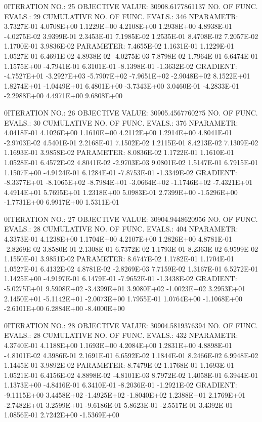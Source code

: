 \documentclass[
  letterpaper,
  toc=chapterentrywithdots,
  listof=totoc,
  11pt,
  headings=small,
  usegeometry]{scrreprt}
\begin{document}
\begin{nonmemlisting}
0ITERATION NO.:   25    OBJECTIVE VALUE:   30908.6177861137        NO. OF FUNC. EVALS.:  29
 CUMULATIVE NO. OF FUNC. EVALS.:      346
 NPARAMETR:  3.7327E-01  4.0708E+00  1.1229E+00  4.2108E+00  1.2938E+00  4.8938E-01 -4.0275E-02  3.9399E-01  2.3453E-01  7.1985E-02
             1.2535E-01  8.4708E-02  7.2057E-02  1.1700E-01  3.9836E-02
 PARAMETER:  7.4655E-02  1.1631E-01  1.1229E-01  1.0527E-01  6.4691E-02  4.8938E-02 -4.0275E-03  7.8798E-02  1.7964E-01  6.6474E-01
             1.1575E+00 -4.7941E-01  6.3101E-01 -8.1398E-01 -1.3632E-02
 GRADIENT:  -4.7527E+01 -3.2927E+03 -5.7907E+02 -7.9651E+02 -2.9048E+02  8.1522E+01  1.8274E+01 -1.0449E+01  6.4801E+00 -3.7343E+00
             3.0460E-01 -4.2833E-01 -2.2988E+00  4.4971E+00  9.6808E+00

0ITERATION NO.:   26    OBJECTIVE VALUE:   30905.4567760275        NO. OF FUNC. EVALS.:  30
 CUMULATIVE NO. OF FUNC. EVALS.:      376
 NPARAMETR:  4.0418E-01  4.1026E+00  1.1610E+00  4.2112E+00  1.2914E+00  4.8041E-01 -2.9703E-02  4.5401E-01  2.2168E-01  7.1502E-02
             1.2115E-01  8.4213E-02  7.1309E-02  1.1693E-01  3.9858E-02
 PARAMETER:  8.0836E-02  1.1722E-01  1.1610E-01  1.0528E-01  6.4572E-02  4.8041E-02 -2.9703E-03  9.0801E-02  1.5147E-01  6.7915E-01
             1.1507E+00 -4.9124E-01  6.1284E-01 -7.8753E-01 -1.3349E-02
 GRADIENT:  -8.3377E+01 -8.1065E+02 -8.7984E+01 -3.0664E+02 -1.1746E+02 -7.4321E+01  4.4914E+01  5.7695E+01  1.2318E+00  5.0983E-01
             2.7399E+00 -1.5296E+00 -1.7731E+00  6.9917E+00  1.5311E-01

0ITERATION NO.:   27    OBJECTIVE VALUE:   30904.9448620956        NO. OF FUNC. EVALS.:  28
 CUMULATIVE NO. OF FUNC. EVALS.:      404
 NPARAMETR:  4.3373E-01  4.1238E+00  1.1704E+00  4.2107E+00  1.2826E+00  4.8781E-01 -2.8269E-02  3.8580E-01  2.1308E-01  6.7372E-02
             1.1793E-01  8.2363E-02  6.9599E-02  1.1550E-01  3.9851E-02
 PARAMETER:  8.6747E-02  1.1782E-01  1.1704E-01  1.0527E-01  6.4132E-02  4.8781E-02 -2.8269E-03  7.7159E-02  1.3167E-01  6.5272E-01
             1.1425E+00 -4.9197E-01  6.1479E-01 -7.9652E-01 -1.3438E-02
 GRADIENT:  -5.0275E+01  9.5908E+02 -3.4399E+01  3.9080E+02 -1.0023E+02  3.2953E+01  2.1450E+01 -5.1142E+01 -2.0073E+00  1.7955E-01
             1.0764E+00 -1.1068E+00 -2.6101E+00  6.2884E+00 -8.4000E+00

0ITERATION NO.:   28    OBJECTIVE VALUE:   30904.5819376394        NO. OF FUNC. EVALS.:  28
 CUMULATIVE NO. OF FUNC. EVALS.:      432
 NPARAMETR:  4.3740E-01  4.1188E+00  1.1693E+00  4.2084E+00  1.2831E+00  4.8898E-01 -4.8101E-02  4.3986E-01  2.1691E-01  6.6592E-02
             1.1844E-01  8.2466E-02  6.9948E-02  1.1445E-01  3.9892E-02
 PARAMETER:  8.7479E-02  1.1768E-01  1.1693E-01  1.0521E-01  6.4156E-02  4.8898E-02 -4.8101E-03  8.7972E-02  1.4058E-01  6.3944E-01
             1.1373E+00 -4.8416E-01  6.3410E-01 -8.2036E-01 -1.2921E-02
 GRADIENT:  -9.1115E+00  3.4458E+02 -1.4925E+02 -1.8040E+02  1.2388E+01  2.1769E+01 -2.7482E+01  3.2599E+01 -9.6186E-01  5.8623E-01
            -2.5517E-01  3.4392E-01  1.0856E-01  2.7242E+00 -1.5369E+00


\end{nonmemlisting}
\end{document}
